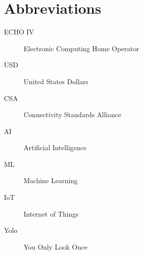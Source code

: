 \chapter*{Abbreviations}\label{abbr}
\begin{description}
\item[ECHO IV] Electronic Computing Home Operator
\item[USD] United States Dollars
\item[CSA] Connectivity Standards Alliance
\item[AI] Artificial Intelligence
\item[ML] Machine Learning 
\item[IoT] Internet of Things
\item[Yolo] You Only Look Once
\end{description}
